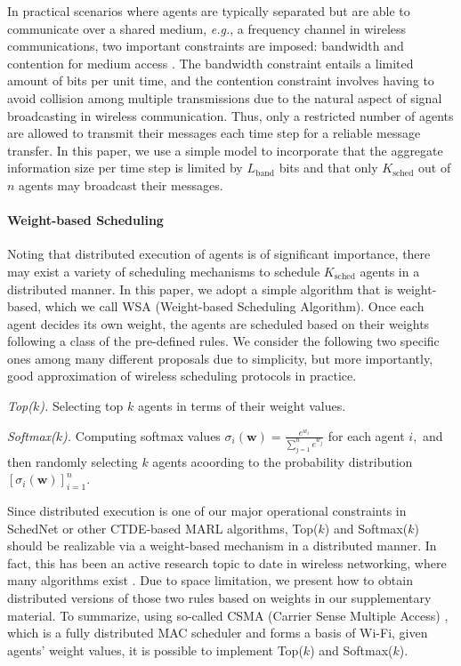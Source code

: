 \documentclass{article} %
\newcommand{\sched}{SchedNet}
\newcommand{\myparagraph}[1]{\vspace{-0.25cm} \paragraph{#1}}
\begin{document}
In practical scenarios where agents are typically separated but are
able to communicate over a shared medium, {\em e.g.}, a frequency channel in wireless communications, two important constraints are
imposed: bandwidth and contention for medium access \citep{wcp}. The
bandwidth constraint entails a limited amount of bits per unit time,
and the contention constraint involves having to avoid collision among
multiple transmissions due to the natural aspect of signal
broadcasting in wireless communication. Thus, only a restricted number
of agents are allowed to transmit their messages each time step for a reliable
message transfer. In this paper, we use a simple model to incorporate
that the aggregate information size per time step is limited by
$L_{\text{band}}$ bits and that only $K_{\text{sched}}$ out of $n$ agents
may broadcast their messages.

\myparagraph{Weight-based Scheduling} Noting that distributed
execution of agents is of significant importance, there may exist a
variety of scheduling mechanisms to schedule $K_{\text{sched}}$ agents
in a distributed manner. In this paper, we adopt a simple algorithm
that is weight-based, which we call WSA (Weight-based Scheduling
Algorithm). Once each agent decides its own weight, the
agents are scheduled based on their weights following a class of the
pre-defined rules.  We consider the following two specific ones among many
different proposals due to simplicity, but more importantly,
good approximation of wireless scheduling protocols in practice. 
\begin{compactitem}[$\circ$]
\item {\em Top($k$).} Selecting top $k$ agents in terms of their
  weight values.
\item {\em Softmax($k$).} Computing softmax values
  $\sigma_i({\bm w}) = \frac{e^{w_i}}{\sum_{j=1}^{n}e^{w_j}}$ for each
  agent $i,$ and then randomly selecting $k$ agents acoording to the probability distribution $[\sigma_i({\bm w})]_{i=1}^n.$
\end{compactitem}

Since distributed execution is one of our major operational
constraints in {\sched} or other CTDE-based MARL algorithms, Top($k$)
and Softmax($k$) should be realizable via a weight-based mechanism in
a distributed manner. In fact, this has been an active research topic
to date in wireless networking, where many algorithms exist
\citep{tassiulas1992stability, yy_scheduling,jiang2010distributed}.
Due to space limitation, we present how to obtain distributed versions
of those two rules based on weights in our supplementary material. To
summarize, using so-called CSMA (Carrier Sense Multiple Access) \citep{kurose2005computer},
which is a fully distributed MAC scheduler and forms a basis of Wi-Fi,
given agents' weight values, it is possible to implement Top($k$) and
Softmax($k$).
\end{document}
